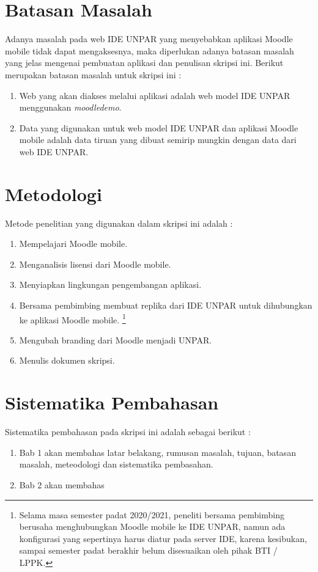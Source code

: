 \section{Batasan Masalah}
\label{sec:batasan}
Adanya masalah pada web IDE UNPAR yang menyebabkan aplikasi Moodle mobile tidak dapat mengaksesnya, maka diperlukan adanya batasan masalah yang jelas mengenai pembuatan aplikasi dan penulisan skripsi ini. Berikut merupakan batasan masalah untuk skripsi ini :
\begin{enumerate}
	\item Web yang akan diakses melalui aplikasi adalah web model IDE UNPAR menggunakan \textit{moodledemo}.
	\item Data yang digunakan untuk web model IDE UNPAR dan aplikasi Moodle mobile adalah data tiruan yang dibuat semirip mungkin dengan data dari web IDE UNPAR.
\end{enumerate}

\section{Metodologi}
\label{sec:metlit}
Metode penelitian yang digunakan dalam skripsi ini adalah :
\begin{enumerate}
		\item Mempelajari Moodle mobile.
		\item Menganalisis lisensi dari Moodle mobile.
		\item Menyiapkan lingkungan pengembangan aplikasi.
		\item Bersama pembimbing membuat replika dari IDE UNPAR untuk dihubungkan ke aplikasi Moodle mobile. \footnote{Selama masa semester padat 2020/2021, peneliti bersama pembimbing berusaha menghubungkan Moodle mobile ke IDE UNPAR, namun ada konfigurasi yang sepertinya harus diatur pada server IDE, karena kesibukan, sampai semester padat berakhir belum disesuaikan oleh pihak BTI / LPPK.}
		\item Mengubah branding dari Moodle menjadi UNPAR.
		\item Menulis dokumen skripsi.
\end{enumerate}

\section{Sistematika Pembahasan}
\label{sec:sispem}
 Sistematika pembahasan pada skripsi ini adalah sebagai berikut :
 \begin{enumerate}
 	\item Bab 1 akan membahas latar belakang, rumusan masalah, tujuan, batasan masalah, meteodologi dan sistematika pembasahan.
 	\item Bab 2 akan membahas 
 \end{enumerate}